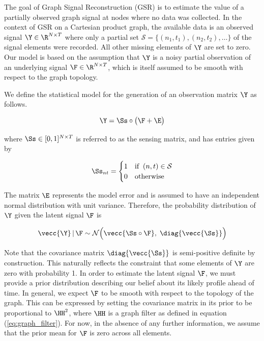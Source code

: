 \label{sec:problem_statement_2d}


The goal of Graph Signal Reconstruction (GSR) is to estimate the value of a partially observed graph signal at nodes where no data was collected. In the context of GSR on a Cartesian product graph, the available data is an observed signal $\Y \in \R^{N \times T}$ where only a partial set $\mathcal{S} = \{(n_1, t_1), (n_2, t_2), \dots \}$ of the signal elements were recorded. All other missing elements of $\Y$ are set to zero. Our model is based on the assumption that $\Y$ is a noisy partial observation of an underlying signal $\F \in \R^{N \times T}$, which is itself assumed to be smooth with respect to the graph topology.

We define the statistical model for the generation of an observation matrix $\Y$ as follows. 

\begin{equation}
    \Y = \Ss \circ \big(\F + \E \big)
\end{equation}

where $\Ss \in [0, 1]^{N \times T}$ is referred to as the sensing matrix, and has entries given by

\begin{equation}
    \Ss_{nt} = \begin{cases}
        1 & \text{if} \;\; (n, t) \in \mathcal{S} \\
        0 & \text{otherwise}
    \end{cases}
\end{equation}

The matrix $\E$ represents the model error and is assumed to have an independent normal distribution with unit variance. Therefore, the probability distribution of $\Y$ given the latent signal $\F$ is

\begin{equation}
    \label{eq:Y_given_F}
    \vecc{\Y} \, | \, \F \sim \mathcal{N}\Big(\vecc{\Ss \circ \F}, \; \diag{\vecc{\Ss}}\Big)
\end{equation}

Note that the covariance matrix $\diag{\vecc{\Ss}}$ is semi-positive definite by construction. This naturally reflects the constraint that some elements of $\Y$ are zero with probability 1. In order to estimate the latent signal $\F$, we must provide a prior distribution describing our belief about its likely profile ahead of time. In general, we expect $\F$ to be smooth with respect to the topology of the graph. This can be expressed by setting the covariance matrix in its prior to be proportional to $\HH^2$, where $\HH$ is a graph filter as defined in equation (\ref{eq:graph_filter}). For now, in the absence of any further information, we assume that the prior mean for $\F$ is zero across all elements.

